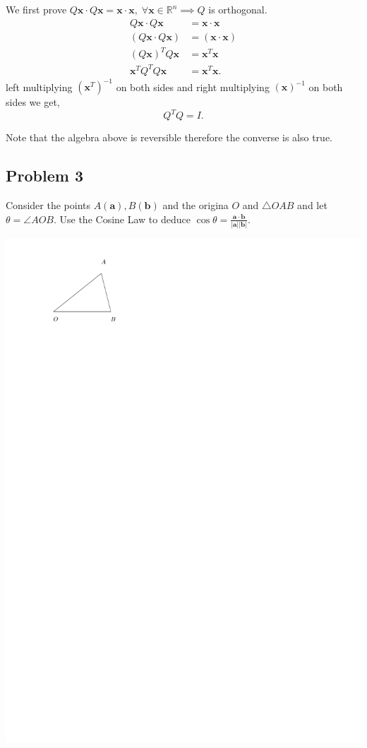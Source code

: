 \begin{solution}
We first prove \( Q \mathbf{x} \cdot Q\mathbf{x} = \mathbf{x} \cdot \mathbf{x}, \; \forall \mathbf{x} \in \mathbb{R}^{n} \implies Q \)  is orthogonal.
\begin{align*}
  Q \mathbf{x} \cdot Q \mathbf{x} &= \mathbf{x} \cdot \mathbf{x} \\
  (Q \mathbf{x} \cdot Q \mathbf{x}) &= (\mathbf{x} \cdot \mathbf{x}) \\
  (Q \mathbf{x})^{T} Q \mathbf{x} &= \mathbf{x}^{T} \mathbf{x}  \\ 
  \mathbf{x}^{T} Q^{T}Q \mathbf{x} &= \mathbf{x}^{T} \mathbf{x}
.\end{align*}
left multiplying \( \left( \mathbf{x}^{T} \right)^{-1} \) on both sides and
right multiplying  \( \left( \mathbf{x} \right)^{-1} \) on both sides we get,
\[
  Q^{T}Q = I
.\] 

Note that the algebra above is reversible therefore the converse is also true.
\end{solution}

\subsection{Problem 3}
Consider the points \( A(\mathbf{a}), B \left( \mathbf{b} \right) \) and the origina \( O \) and \( \triangle OAB \) and let \( \theta = \angle AOB \). Use 
the Cosine Law to deduce \( \cos  \theta = \frac{\mathbf{a} \cdot \mathbf{b}}{|\mathbf{a} | |\mathbf{b} |}  \).

\includegraphics{./figures/fig1}

